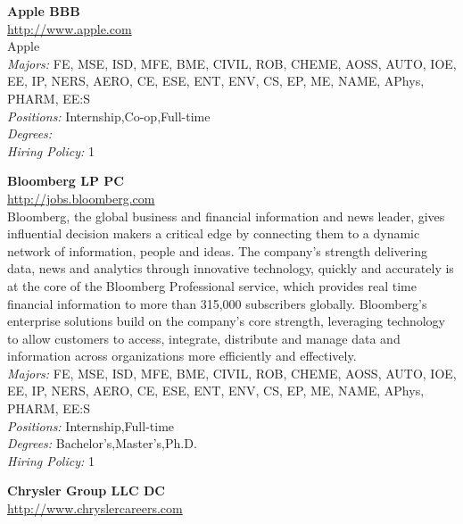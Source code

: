 \documentclass[twoside]{article}
\begin{document}
    \begin{center}\begin{multicols}{2}
    \begin{minipage}{.95\columnwidth}{\Large\bf Apple \hfill BBB}\\
    \url{http://www.apple.com}\\
    Apple\\
    \emph{Majors:} FE, MSE, ISD, MFE, BME, CIVIL, ROB, CHEME, AOSS, AUTO, IOE, EE, IP, NERS, AERO, CE, ESE, ENT, ENV, CS, EP, ME, NAME, APhys, PHARM, EE:S\\
    \emph{Positions:} Internship,Co-op,Full-time\\
    \emph{Degrees:} \\
    \emph{Hiring Policy:} 1\\
\end{minipage}
 \begin{minipage}{.95\columnwidth}{\Large\bf Bloomberg LP \hfill PC}\\
    \url{http://jobs.bloomberg.com}\\
    Bloomberg, the global business and financial information and news leader, gives influential decision makers a critical edge by connecting them to a dynamic network of information, people and ideas. The company's strength delivering data, news and analytics through innovative technology, quickly and accurately is at the core of the Bloomberg Professional service, which provides real time financial information to more than 315,000 subscribers globally. Bloomberg's enterprise solutions build on the company's core strength, leveraging technology to allow customers to access, integrate, distribute and manage data and information across organizations more efficiently and effectively.\\
    \emph{Majors:} FE, MSE, ISD, MFE, BME, CIVIL, ROB, CHEME, AOSS, AUTO, IOE, EE, IP, NERS, AERO, CE, ESE, ENT, ENV, CS, EP, ME, NAME, APhys, PHARM, EE:S\\
    \emph{Positions:} Internship,Full-time\\
    \emph{Degrees:} Bachelor's,Master's,Ph.D.\\
    \emph{Hiring Policy:} 1\\
\end{minipage}
 \begin{minipage}{.95\columnwidth}{\Large\bf Chrysler Group LLC \hfill DC}\\
    \url{http://www.chryslercareers.com}\\

\end{minipage}
\end{multicols}
\end{center}
\end{document}
